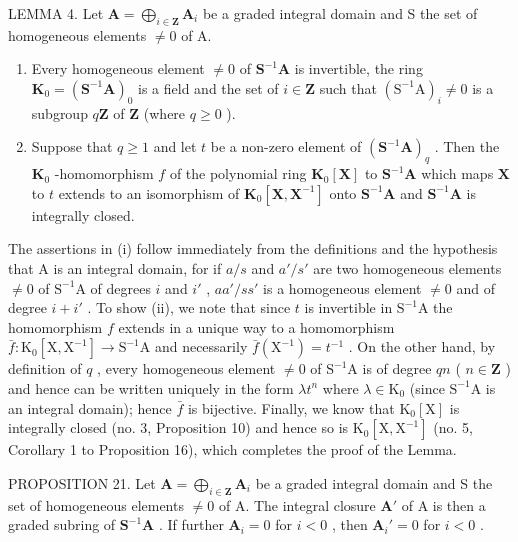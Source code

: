 LEMMA 4. Let \(\mathbf{A} = \bigoplus_{i\in \mathbf{Z}}\mathbf{A}_i\) be a graded integral domain and S the set of homogeneous elements \(\neq 0\) of A.

\begin{enumerate}
\def\labelenumi{(\roman{enumi})}
\item
  Every homogeneous element \(\neq 0\) of \(\mathbf{S}^{-1}\mathbf{A}\) is invertible, the ring \(\mathbf{K}_0 = (\mathbf{S}^{-1}\mathbf{A})_0\) is a field and the set of \(i\in \mathbf{Z}\) such that \((\mathrm{S}^{-1}\mathrm{A})_i\neq 0\) is a subgroup \(q\mathbf{Z}\) of \(\mathbf{Z}\) (where \(q\geqslant 0\) ).
\item
  Suppose that \(q \geqslant 1\) and let \(t\) be a non-zero element of \((\mathbf{S}^{-1}\mathbf{A})_q\) . Then the \(\mathbf{K}_0\) -homomorphism \(f\) of the polynomial ring \(\mathbf{K}_0[\mathbf{X}]\) to \(\mathbf{S}^{-1}\mathbf{A}\) which maps \(\mathbf{X}\) to \(t\) extends to an isomorphism of \(\mathbf{K}_0[\mathbf{X}, \mathbf{X}^{-1}]\) onto \(\mathbf{S}^{-1}\mathbf{A}\) and \(\mathbf{S}^{-1}\mathbf{A}\) is integrally closed.
\end{enumerate}

The assertions in (i) follow immediately from the definitions and the hypothesis that A is an integral domain, for if \(a/s\) and \(a'/s'\) are two homogeneous elements \(\neq 0\) of \(\mathrm{S}^{-1}\mathrm{A}\) of degrees \(i\) and \(i'\) , \(aa'/ss'\) is a homogeneous element \(\neq 0\) and of degree \(i+i'\) . To show (ii), we note that since \(t\) is invertible in \(\mathrm{S}^{-1}\mathrm{A}\) the homomorphism \(f\) extends in a unique way to a homomorphism \(\bar{f}: \mathrm{K}_0[\mathrm{X}, \mathrm{X}^{-1}] \to \mathrm{S}^{-1}\mathrm{A}\) and necessarily \(\bar{f}(\mathrm{X}^{-1}) = t^{-1}\) . On the other hand, by definition of \(q\) , every homogeneous element \(\neq 0\) of \(\mathrm{S}^{-1}\mathrm{A}\) is of degree \(qn\) ( \(n \in \mathbf{Z}\) ) and hence can be written uniquely in the form \(\lambda t^n\) where \(\lambda \in \mathrm{K}_0\) (since \(\mathrm{S}^{-1}\mathrm{A}\) is an integral domain); hence \(\bar{f}\) is bijective. Finally, we know that \(\mathrm{K}_0[\mathrm{X}]\) is integrally closed (no. 3, Proposition 10) and hence so is \(\mathrm{K}_0[\mathrm{X}, \mathrm{X}^{-1}]\) (no. 5, Corollary 1 to Proposition 16), which completes the proof of the Lemma.

PROPOSITION 21. Let \(\mathbf{A} = \bigoplus_{i\in \mathbf{Z}}\mathbf{A}_i\) be a graded integral domain and S the set of homogeneous elements \(\neq 0\) of A. The integral closure \(\mathbf{A}'\) of A is then a graded subring of \(\mathbf{S}^{-1}\mathbf{A}\) . If further \(\mathbf{A}_i = 0\) for \(i < 0\) , then \(\mathbf{A}_i' = 0\) for \(i < 0\) .

